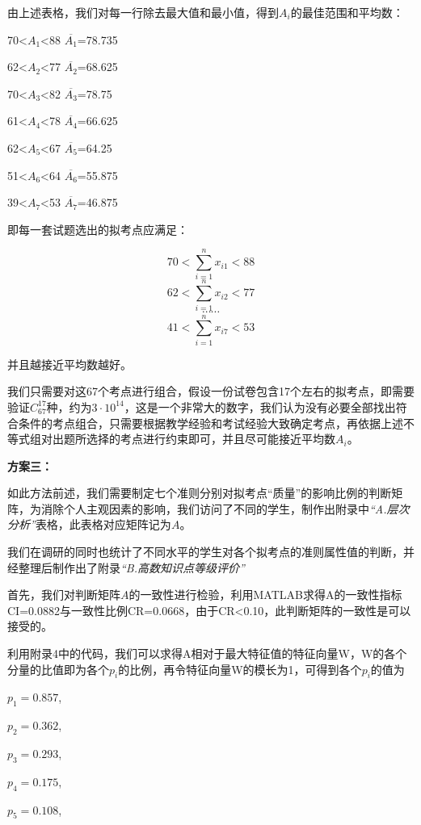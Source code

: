 \documentclass{ctexart}
\begin{document}
由上述表格，我们对每一行除去最大值和最小值，得到$A_{i}$的最佳范围和平均数：

70<$A_{1}$<88       \qquad       $\overline{A_{1}}$=78.735

62<$A_{2}$<77       \qquad     $\overline{A_{2}}$=68.625

70<$A_{3}$<82       \qquad       $\overline{A_{3}}$=78.75

61<$A_{4}$<78       \qquad       $\overline{A_{4}}$=66.625

62<$A_{5}$<67       \qquad       $\overline{A_{5}}$=64.25

51<$A_{6}$<64       \qquad       $\overline{A_{6}}$=55.875

39<$A_{7}$<53       \qquad       $\overline{A_{7}}$=46.875

即每一套试题选出的拟考点应满足：

          $$70<\sum\limits_{i=1}^{n}x_{i1}<88$$
          $$62<\sum\limits_{i=1}^{n}x_{i2}<77 $$
         $$\cdots\cdots$$
          $$41<\sum\limits_{i=1}^{n}x_{i7}<53$$

并且越接近平均数越好。

我们只需要对这67个考点进行组合，假设一份试卷包含17个左右的拟考点，即需要验证$C_{67}^{17}$种，约为$3\cdot10^{14}$，这是一个非常大的数字，我们认为没有必要全部找出符合条件的考点组合，只需要根据教学经验和考试经验大致确定考点，再依据上述不等式组对出题所选择的考点进行约束即可，并且尽可能接近平均数$A_{i}$。

\textbf{方案三：}

如此方法前述，我们需要制定七个准则分别对拟考点“质量”的影响比例的判断矩阵，为消除个人主观因素的影响，我们访问了不同的学生，制作出附录中\emph{“A.层次分析”}表格，此表格对应矩阵记为$A$。

我们在调研的同时也统计了不同水平的学生对各个拟考点的准则属性值的判断，并经整理后制作出了附录\emph{“B.高数知识点等级评价”}

首先，我们对判断矩阵$A$的一致性进行检验，利用MATLAB求得A的一致性指标CI=0.0882与一致性比例CR=0.0668，由于CR<0.10，此判断矩阵的一致性是可以接受的。

利用附录4中的代码，我们可以求得A相对于最大特征值的特征向量W，W的各个分量的比值即为各个$p_{i}$的比例，再令特征向量W的模长为1，可得到各个$p_{i}$的值为

$p_{1}=0.857$,

$p_{2}=0.362$,

$p_{3}=0.293$,

$p_{4}=0.175$,

$p_{5}=0.108$,
\end{document}
